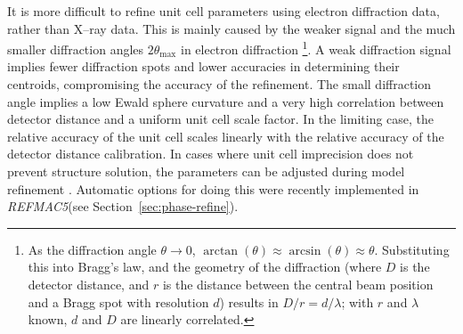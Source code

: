 \documentclass[preprint]{iucr}
\newcommand{\refmac}{\emph{REFMAC5}\xspace}
\newcounter{DWCounter}
\newcommand{\DW}[1]{%
   \stepcounter{DWCounter}%
   {\color{red}{\textbf{DW \#\arabic{DWCounter}: }#1}}%
  }
\begin{document}
It is more difficult to refine unit cell parameters using electron
diffraction data, rather than X--ray data. This is mainly caused by the weaker
signal and the much smaller diffraction angles $2\theta_\text{max}$ in electron diffraction
\footnote{As the diffraction angle $\theta \to 0$, $\arctan(\theta) \approx \arcsin(\theta)
\approx \theta$. Substituting this into Bragg's law, and the geometry of the diffraction (where
$D$ is the detector distance, and $r$ is the distance between the central beam position and a Bragg
spot with resolution $d$) results in $D/r = d/\lambda$; with $r$ and $\lambda$ known, $d$ and $D$ are
linearly correlated.}.
A weak diffraction signal implies fewer diffraction spots and lower accuracies in
determining their centroids, compromising the accuracy of the refinement. The small diffraction
angle implies a low Ewald sphere curvature and a very high correlation between detector
distance and a uniform unit cell scale factor. In the limiting case, the relative
accuracy of the unit cell scales linearly with the relative accuracy of the detector
distance calibration. In cases where unit cell imprecision does not prevent structure
solution, the parameters can be adjusted during model refinement \cite{Gruene2018}.
Automatic options for doing this were recently implemented in \refmac (see
Section~\ref{sec:phase-refine}).

\end{document}
